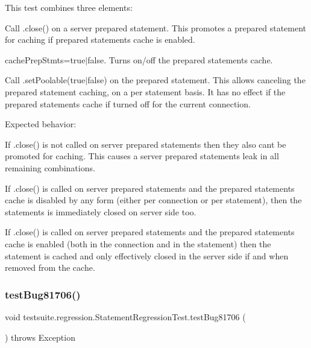 This test combines three elements\+:
\begin{DoxyEnumerate}
\item Call .close() on a server prepared statement. This promotes a prepared statement for caching if prepared statements cache is enabled.
\item cache\+Prep\+Stmts=true$\vert$false. Turns on/off the prepared statements cache.
\item Call .set\+Poolable(true$\vert$false) on the prepared statement. This allows canceling the prepared statement caching, on a per statement basis. It has no effect if the prepared statements cache if turned off for the current connection.
\end{DoxyEnumerate}

Expected behavior\+:
\begin{DoxyItemize}
\item If .close() is not called on server prepared statements then they also can\textquotesingle{}t be promoted for caching. This causes a server prepared statements leak in all remaining combinations.
\item If .close() is called on server prepared statements and the prepared statements cache is disabled by any form (either per connection or per statement), then the statements is immediately closed on server side too.
\item If .close() is called on server prepared statements and the prepared statements cache is enabled (both in the connection and in the statement) then the statement is cached and only effectively closed in the server side if and when removed from the cache. 
\end{DoxyItemize}\mbox{\label{classtestsuite_1_1regression_1_1_statement_regression_test_aa0b8a4caabb1d1ebc0338bcffacce81d}} 
\subsubsection{\texorpdfstring{test\+Bug81706()}{testBug81706()}}
{\footnotesize\ttfamily void testsuite.\+regression.\+Statement\+Regression\+Test.\+test\+Bug81706 (\begin{DoxyParamCaption}{ }\end{DoxyParamCaption}) throws Exception}

